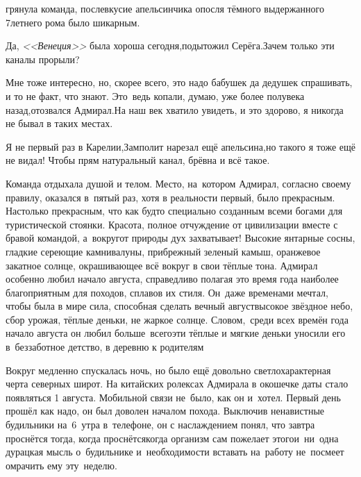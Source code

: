 \mdash грянула команда, послевкусие апельсинчика опосля тёмного выдержанного 7\sdash летнего рома было шикарным.

\diagdash Да, \textit{<<Венеция>>} была хороша сегодня,\mdash подытожил Серёга.\mdash Зачем только эти каналы прорыли?

\diagdash Мне тоже интересно, но, скорее всего, это надо бабушек да дедушек спрашивать, и то не факт, что знают. Это~ведь копали, думаю, уже более полувека назад,\mdash отозвался Адмирал.\mdash На наш век хватило увидеть, и это здорово, я никогда не бывал в таких местах.

\diagdash Я не первый раз в Карелии,\mdash Замполит нарезал ещё апельсина,\mdash но такого я тоже ещё не видал! Чтобы прям натуральный канал, брёвна и всё такое.%

Команда отдыхала душой и телом. Место, на~котором Адмирал, согласно своему правилу, оказался в~пятый раз, хотя в реальности первый, было прекрасным. Настолько прекрасным, что как будто специально созданным всеми богами для туристической стоянки. Красота, полное отчуждение от цивилизации вместе с бравой командой, а~вокруг\mdash от природы дух захватывает! Высокие янтарные сосны, гладкие сереющие камни\sdash валуны, прибрежный зеленый камыш, оранжевое закатное солнце, окрашивающее всё вокруг в свои тёплые тона. Адмирал особенно любил начало августа, справедливо полагая это время года наиболее благоприятным для походов, сплавов их стиля. Он~даже временами мечтал, чтобы была в мире сила, способная сделать вечный август\mdash высокое звёздное небо, сбор урожая, тёплые деньки, не жаркое солнце. Словом,~среди всех времён года начало августа он любил больше~всего\mdash эти тёплые и мягкие деньки уносили его в~беззаботное детство, в деревню к родителям\myldots{}

\vspace{0.5cm}
\myldots{}Вокруг медленно спускалась ночь, но было ещё довольно светло\mdash характерная черта северных широт. На китайских ролексах Адмирала в окошечке даты стало появляться 1 августа. Мобильной связи не~было, как он и~хотел. Первый день прошёл как надо, он был доволен началом похода. Выключив ненавистные будильники на~6~утра в~телефоне, он с наслаждением понял, что завтра проснётся тогда, когда проснётся\mdash когда организм сам пожелает этого\mdash и~ни~одна дурацкая мысль о~будильнике и~необходимости вставать на~работу не~посмеет омрачить ему эту~неделю. 

\begin{center}
\end{center}